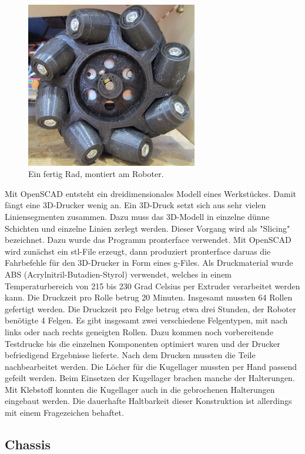 \documentclass[a4paper,bibtotoc,oneside]{scrbook}
\begin{document}
\begin{figure}[htbp]
\centering
\includegraphics[width=75mm]{img/rad.jpg}
\caption{Ein fertig Rad, montiert am Roboter.}\label{rad2}
\end{figure}


Mit OpenSCAD entsteht ein dreidimensionales Modell eines Werkstückes. Damit fängt eine 3D-Drucker wenig an. Ein 3D-Druck setzt sich aus sehr vielen Liniensegmenten zusammen. Dazu muss das 3D-Modell in einzelne dünne Schichten und einzelne Linien zerlegt werden. Dieser Vorgang wird als "Slicing" bezeichnet. Dazu wurde das Programm pronterface verwendet. Mit OpenSCAD wird zunächst ein stl-File erzeugt, dann produziert pronterface daruas die Fahrbefehle für den 3D-Drucker in Form eines g-Files. Als Druckmaterial wurde ABS (Acrylnitril-Butadien-Styrol) verwendet, welches in einem Temperaturbereich von 215 bis 230 Grad Celsius per Extruder verarbeitet werden kann.    
Die Druckzeit pro Rolle betrug 20 Minuten. Insgesamt mussten 64 Rollen gefertigt werden. Die Druckzeit pro Felge betrug etwa drei Stunden, der Roboter benötigte 4 Felgen. Es gibt insgesamt zwei verschiedene Felgentypen, mit nach links oder nach rechts geneigten Rollen. 
Dazu kommen noch vorbereitende Testdrucke bis die einzelnen Komponenten optimiert waren und der Drucker befriedigend Ergebnisse lieferte. 
Nach dem Drucken mussten die Teile nachbearbeitet werden.  Die Löcher für die Kugellager mussten per Hand passend gefeilt werden. Beim  Einsetzen der Kugellager brachen manche der Halterungen. Mit Klebstoff konnten die Kugellager auch in die gebrochenen Halterungen eingebaut werden. Die dauerhafte Haltbarkeit dieser Konstruktion ist allerdings mit einem Fragezeichen behaftet.

\subsection{Chassis}\thispagestyle{empty}
\end{document}
